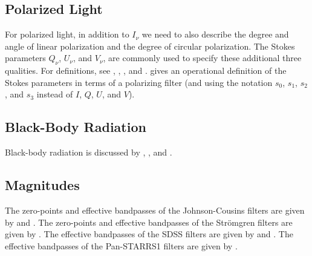 
\subsection{Polarized Light}

For polarized light, in addition to $I_\nu$ we need to also describe the
degree and angle of linear polarization and the degree of circular
polarization. The Stokes parameters $Q_\nu$, $U_\nu$, and $V_\nu$, are
commonly used to specify these additional three qualities. For
definitions, see \citet[pp.\ 24--35]{Chandrasekhar-1960},
\citet[pp.\ 62--69]{Rybicki-1979}, \citet[ch.\ 12]{Shu-1991}, and
\citet[pp.\ 135--137]{Rutten}. \citet[pp.\ 366--367]{Hecht-1998} gives
an operational definition of the Stokes parameters in terms of a
polarizing filter (and using the notation $s_0$, $s_1$, $s_2$, and $s_3$
instead of $I$, $Q$, $U$, and $V$).

\subsection{Black-Body Radiation}

Black-body radiation is discussed by \citet[pp.\ 15--27]{Rybicki-1979},
\citet[pp.\ 6--7]{Mihalas-1978}, and \citet[ch.\ 6]{Gray-1992}.

\subsection{Magnitudes}

The zero-points and effective bandpasses of the Johnson-Cousins filters are given by \citet{Bessell-1988} and \citet{Bessell-2012}. The zero-points and effective bandpasses of the Strömgren filters are given by \citet{Bessell-2011}. The effective bandpasses of the SDSS filters are given by \citet{Fukugita-1996} and \citet{Doi-2010}. The effective bandpasses of the Pan-STARRS1 filters are given by \citet{Tonry-2012}.


